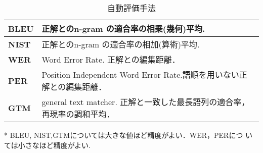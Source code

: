 	
	\begin{table}
	\caption{自動評価手法}
	\begin{center}
	\label{eval}
	\begin{tabular}{ll}
	\hline
	\textbf{BLEU} &
	  \begin{minipage}{105mm}
	  \vspace{1mm}
	  正解とのn-gram の適合率の相乗(幾何)平均\cite{Papineni2002}.
	  \vspace{1mm}
	  \end{minipage}  \\
	\hline
	\textbf{NIST} &
	  \begin{minipage}{105mm}
	  \vspace{1mm}
	  正解とのn-gram の適合率の相加(算術)平均\cite{Doddington2002}.
	  \vspace{1mm}
	  \end{minipage}  \\
	\hline
	\textbf{WER} &
	  \begin{minipage}{105mm}
	  \vspace{1mm}
	  Word Error Rate. 正解との編集距離\cite{Niessen2000}．
	  \vspace{1mm}
	  \end{minipage}  \\
	\hline
	\textbf{PER} &
	  \begin{minipage}{105mm}
	  \vspace{1mm}
	  Position Independent Word Error Rate.語順を用いない正解との編集距離\cite{Och2001}．
	  \vspace{1mm}
	  \end{minipage}  \\
	\hline
	\textbf{GTM} &
	  \begin{minipage}{105mm}
	  \vspace{1mm}
	  general text matcher.
	正解と一致した最長語列の適合率，再現率の調和平均\cite{Turian2003}．
	  \vspace{1mm}
	  \end{minipage}  \\
	\hline
	\end{tabular}
	\end{center}
	{\footnotesize 
	* BLEU, NIST,GTMについては大きな値ほど精度がよい．WER，PERにつ
	いては小さなほど精度がよい.
        }
	\end{table}
	
	
	


	
	
